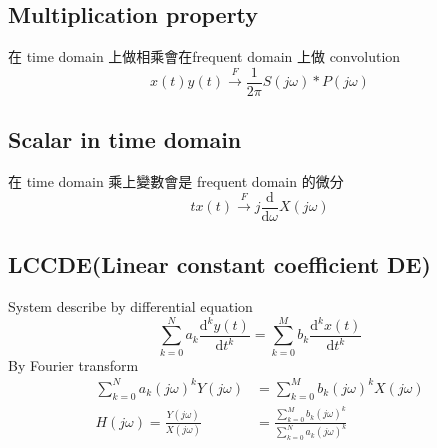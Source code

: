 \documentclass[12pt, a4paper]{article}
\begin{document}
\subsection*{Multiplication property}
在 time domain 上做相乘會在frequent domain 上做 convolution
$$
x(t)y(t) \xrightarrow{F} \frac{1}{2\pi}S(j\omega)*P(j\omega)
$$
\subsection*{Scalar in time domain}
在 time domain 乘上變數會是 frequent domain 的微分
$$
tx(t) \xrightarrow{F} j\frac{\text{d}}{\text{d}\omega}X(j\omega)
$$
\subsection*{LCCDE(Linear constant coefficient DE)}
System describe by differential equation
$$
\sum_{k=0}^{N}a_k\frac{\text{d}^ky(t)}{\text{d}t^k} = \sum_{k=0}^{M}b_k\frac{\text{d}^kx(t)}{\text{d}t^k}
$$
By Fourier transform
\begin{align*}
	\sum_{k=0}^{N}a_k(j\omega)^kY(j\omega) &= \sum_{k=0}^{M}b_k(j\omega)^kX(j\omega) \\ 
	H(j\omega) = \frac{Y(j\omega)}{X(j\omega)} &= \frac{\sum_{k=0}^{M}b_k(j\omega)^k}{\sum_{k=0}^{N}a_k(j\omega)^k}
\end{align*}
\end{document}
